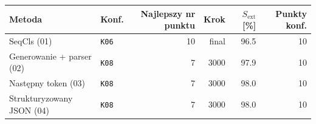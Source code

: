 \begin{tabular}{llrrrr}
\hline
\textbf{Metoda} & \textbf{Konf.} & \textbf{Najlepszy nr punktu} & \textbf{Krok} & \textbf{\(S_{\mathrm{ext}}\) [\%]} & \textbf{Punkty konf.} \\
\hline
SeqCls (01) & \texttt{K06} & 10 & final & 96.5 & 10 \\
Generowanie + parser (02) & \texttt{K08} & 7 & 3000 & 97.9 & 10 \\
Następny token (03) & \texttt{K08} & 7 & 3000 & 98.0 & 10 \\
Strukturyzowany JSON (04) & \texttt{K08} & 7 & 3000 & 98.0 & 10 \\
\hline
\end{tabular}
